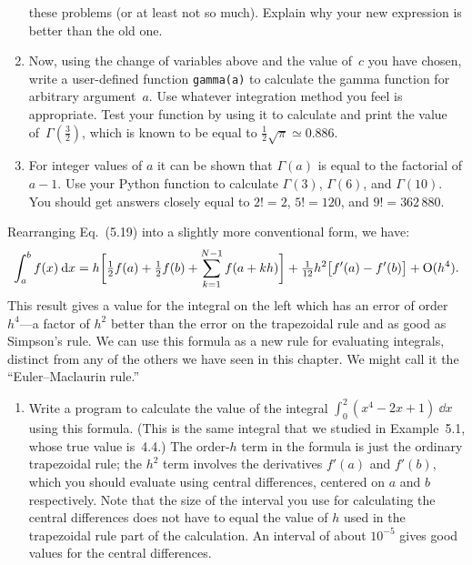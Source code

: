 \documentclass[12pt]{article}
\begin{document}
\begin{exercises}
\begin{enumerate}
  these problems (or at least not so much).  Explain why your new
  expression is better than the old one.
\item Now, using the change of variables above and the value of~$c$ you
  have chosen, write a user-defined function \verb|gamma(a)| to calculate
  the gamma function for arbitrary argument~$a$.  Use whatever integration
  method you feel is appropriate.  Test your function by using it to
  calculate and print the value of~$\Gamma(\frac32)$, which is known to be
  equal to $\frac12\sqrt{\pi}\simeq0.886$.
\item For integer values of $a$ it can be shown that $\Gamma(a)$ is equal
  to the factorial of $a-1$.  Use your Python function to calculate
  $\Gamma(3)$, $\Gamma(6)$, and $\Gamma(10)$.  You should get answers
  closely equal to $2!=2$, $5!=120$, and $9!=362\,880$.
\end{enumerate}



\exercise Rearranging Eq.~(5.19) into a slightly more conventional form, we
have:
\begin{displaymath}
\int_a^b f(x)\>\mathrm{d} x
  = h \biggl[ \tfrac12 f(a) + \tfrac12 f(b) + \sum_{k=1}^{N-1} f(a+kh)
            \biggr] + \tfrac{1}{12} h^2 \bigl[ f'(a) - f'(b) \bigr] +
            \mathrm{O}(h^4).
\end{displaymath}
This result gives a value for the integral on the left which has an error
of order~$h^4$---a factor of $h^2$ better than the error on the trapezoidal
rule and as good as Simpson's rule.  We can use this formula as a new rule
for evaluating integrals, distinct from any of the others we have seen in
this chapter.  We might call it the ``Euler--Maclaurin rule.''
\begin{enumerate}\setlength{\itemsep}{0pt}
\item Write a program to calculate the value of the integral $\int_0^2
  (x^4-2x+1) \>\dd x$ using this formula.  (This is the same integral that
  we studied in Example~5.1, whose true value is~4.4.)  The order-$h$ term
  in the formula is just the ordinary trapezoidal rule; the $h^2$ term
  involves the derivatives $f'(a)$ and $f'(b)$, which you should evaluate
  using central differences, centered on $a$ and $b$ respectively.  Note
  that the size of the interval you use for calculating the central
  differences does not have to equal the value of $h$ used in the
  trapezoidal rule part of the calculation.  An interval of about $10^{-5}$
  gives good values for the central differences.


\end{enumerate}
\end{exercises}
\end{document}
